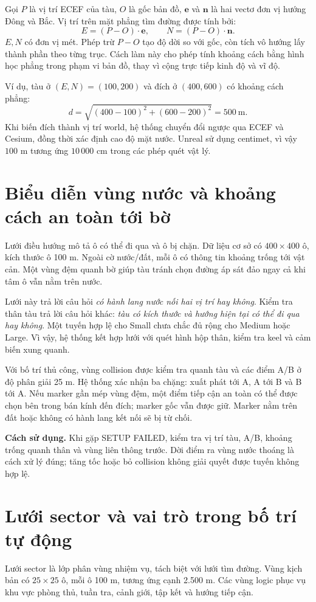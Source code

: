 \documentclass[11pt,a4paper,oneside]{report}
\newcommand{\howto}[1]{\par\smallskip\noindent\textbf{Cách sử dụng.} #1\par}
\begin{document}
Gọi $P$ là vị trí ECEF của tàu, $O$ là gốc bản đồ, $\mathbf e$ và $\mathbf n$ là hai vectơ đơn vị hướng Đông và Bắc. Vị trí trên mặt phẳng tìm đường được tính bởi:
\begin{equation}\label{eq:enu}
 E=(P-O)\cdot\mathbf e,\qquad N=(P-O)\cdot\mathbf n.
\end{equation}
$E,N$ có đơn vị mét. Phép trừ $P-O$ tạo độ dời so với gốc, còn tích vô hướng lấy thành phần theo từng trục. Cách làm này cho phép tính khoảng cách bằng hình học phẳng trong phạm vi bản đồ, thay vì cộng trực tiếp kinh độ và vĩ độ.

Ví dụ, tàu ở $(E,N)=(100,200)$ và đích ở $(400,600)$ có khoảng cách phẳng:
\[
 d=\sqrt{(400-100)^2+(600-200)^2}=500\ \text{m}.
\]
Khi biến đích thành vị trí world, hệ thống chuyển đổi ngược qua ECEF và Cesium, đồng thời xác định cao độ mặt nước. Unreal sử dụng centimet, vì vậy $100$ m tương ứng $10\,000$ cm trong các phép quét vật lý.

\section{Biểu diễn vùng nước và khoảng cách an toàn tới bờ}
Lưới điều hướng mô tả ô có thể đi qua và ô bị chặn. Dữ liệu cơ sở có $400\times400$ ô, kích thước ô 100 m. Ngoài cờ nước/đất, mỗi ô có thông tin khoảng trống tới vật cản. Một vùng đệm quanh bờ giúp tàu tránh chọn đường áp sát đảo ngay cả khi tâm ô vẫn nằm trên nước.

Lưới này trả lời câu hỏi \textit{có hành lang nước nối hai vị trí hay không}. Kiểm tra thân tàu trả lời câu hỏi khác: \textit{tàu có kích thước và hướng hiện tại có thể đi qua hay không}. Một tuyến hợp lệ cho Small chưa chắc đủ rộng cho Medium hoặc Large. Vì vậy, hệ thống kết hợp lưới với quét hình hộp thân, kiểm tra keel và cảm biến xung quanh.

Với bố trí thủ công, vùng collision được kiểm tra quanh tàu và các điểm A/B ở độ phân giải 25 m. Hệ thống xác nhận ba chặng: xuất phát tới A, A tới B và B tới A. Nếu marker gần mép vùng đệm, một điểm tiếp cận an toàn có thể được chọn bên trong bán kính đến đích; marker gốc vẫn được giữ. Marker nằm trên đất hoặc không có hành lang kết nối sẽ bị từ chối.
\howto{Khi gặp SETUP FAILED, kiểm tra vị trí tàu, A/B, khoảng trống quanh thân và vùng liên thông trước. Dời điểm ra vùng nước thoáng là cách xử lý đúng; tăng tốc hoặc bỏ collision không giải quyết được tuyến không hợp lệ.}

\section{Lưới sector và vai trò trong bố trí tự động}
Lưới sector là lớp phân vùng nhiệm vụ, tách biệt với lưới tìm đường. Vùng kịch bản có $25\times25$ ô, mỗi ô 100 m, tương ứng cạnh 2.500 m. Các vùng logic phục vụ khu vực phòng thủ, tuần tra, cảnh giới, tập kết và hướng tiếp cận.
\end{document}
